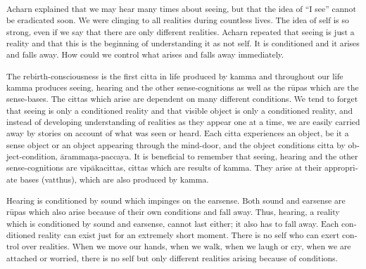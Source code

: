 \textsuperscript{\textportuguese{Acharn}\textdutch{ explained that we
may hear many times about seeing, but that the idea of ``I see'' cannot
be eradicated soon. We were clinging to all realities during countless
lives. }\textenglish[variant=american]{The idea of self is so strong,
even if we say that there are only different realities.
}\textdutch{Acharn repeated that seeing is just a reality and that this
is the beginning of understanding it as not self. It is conditioned and
it arises and falls away. How could we control what arises and falls
away immediately. }}

\textsuperscript{\textdutch{The rebirth-consciousness is the first citta
in life produced by kamma and throughout our life kamma produces seeing,
hearing and the other sense-cognitions as well as the rūpas which are
the sense-bases. }\textenglish[variant=american]{The cittas which arise
are dependent on many different conditions. We tend to forget that
seeing is only a conditioned reality and that visible object is only a
conditioned reality, and }\textdutch{instead of developing understanding
of realities as they appear one at a time,
}\textenglish[variant=american]{we are easily carried away
by}\textdutch{ stories on account of what was seen or heard.
}\textenglish[variant=american]{Each citta experiences an object, be it
a sense object or }\textdutch{an }\textfrench{object}\textdutch{
appearing through the mind-door}\textenglish[variant=american]{, and the
object conditions citta by object-condition,
}\textdutch{ārammaṇa-}\textenglish[variant=american]{paccaya. It is
beneficial to remember that seeing, hearing and the other
sense-cognitions are
vip}\textdutch{ā}\textenglish[variant=american]{kacittas, cittas which
are results of kamma. They arise at their appropriate bases}\textdutch{
(}\textenglish[variant=american]{vatthus}\textdutch{)}\textenglish[variant=american]{,
which are also produced by kamma. }}

\textsuperscript{\textenglish[variant=american]{Hearing is conditioned
by sound which impinges on the earsense. Both sound and earsense are
r}\textdutch{ū}\textenglish[variant=american]{pas which also arise
because of their own conditions and fall away. Thus, hearing,
}\textdutch{a}\textenglish[variant=american]{ reality}\textdutch{ which
is conditioned by sound and earsense,}\textenglish[variant=american]{
cannot last either; it also has to fall away. Each conditioned reality
can exist just for an extremely short moment.
}\textdutch{T}\textenglish[variant=american]{here is no self who can
exert control over realities. When we move our hands, when we walk, when
we laugh or cry, when we are attached or worried, there }\textdutch{is
no self but only different realities arising because of conditions.}}

